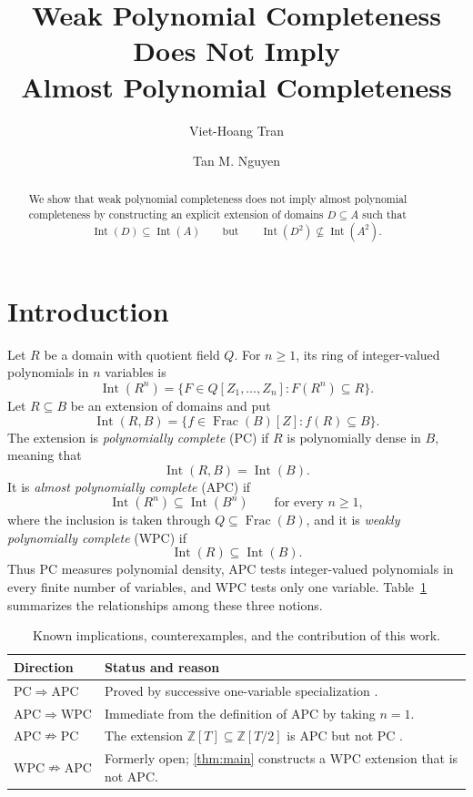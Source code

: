 \documentclass[11pt,reqno]{amsart}
\title[WPC Does Not Imply APC]{Weak Polynomial Completeness Does Not Imply \\ Almost Polynomial Completeness}
\author{Viet-Hoang Tran}
\author{Tan M. Nguyen}
\date{}
\numberwithin{equation}{section}
\theoremstyle{plain}
\theoremstyle{definition}
\theoremstyle{remark}
\newcommand{\Int}{\operatorname{Int}}
\newcommand{\Frac}{\operatorname{Frac}}
\begin{document}
\raggedbottom

\begin{abstract}
We show that weak polynomial completeness does not imply almost
polynomial completeness by constructing an explicit extension of
domains \(D\subseteq A\) such that
\[
 \Int(D)\subseteq\Int(A)
 \qquad\text{but}\qquad
 \Int(D^2)\nsubseteq\Int(A^2).
\]
\end{abstract}

\maketitle

\section{Introduction}

Let \(R\) be a domain with quotient field \(Q\).  For \(n\geq 1\), its
ring of integer-valued polynomials in \(n\) variables is
\[
 \Int(R^n)
   =\{F\in Q[Z_1,\ldots,Z_n]:F(R^n)\subseteq R\}.
\]
Let \(R\subseteq B\) be an extension of domains and put
\[
 \Int(R,B)
   =\{f\in\Frac(B)[Z]:f(R)\subseteq B\}.
\]
The extension is \emph{polynomially complete} (PC) if \(R\) is
polynomially dense in \(B\), meaning that
\[
 \Int(R,B)=\Int(B).
\]
It is \emph{almost polynomially complete} (APC) if
\[
 \Int(R^n)\subseteq\Int(B^n)
 \qquad\text{for every }n\geq1,
\]
where the inclusion is taken through
\(Q\subseteq\Frac(B)\), and it is
\emph{weakly polynomially complete} (WPC) if
\[
 \Int(R)\subseteq\Int(B).
\]
Thus PC measures polynomial density, APC tests integer-valued
polynomials in every finite number of variables, and WPC tests only
one variable. Table~\ref{tab:hierarchy} summarizes the relationships among these three notions.

\begin{table}[H]
\centering
\footnotesize
\renewcommand{\arraystretch}{1.10}
\begin{tabularx}{0.82\textwidth}{@{}lX@{}}
\toprule
Direction & Status and reason\\
\midrule
\(\mathrm{PC}\Rightarrow\mathrm{APC}\)
& Proved by successive one-variable specialization
  \cite[Section~7]{Elliott2007}.\\
\(\mathrm{APC}\Rightarrow\mathrm{WPC}\)
& Immediate from the definition of APC by taking
  \(n=1\).\\
\(\mathrm{APC}\nRightarrow\mathrm{PC}\)
& The extension
  \(\mathbb Z[T]\subseteq\mathbb Z[T/2]\)
  is APC but not PC \cite[p.~231]{Elliott2009}.\\
\(\mathrm{WPC}\nRightarrow\mathrm{APC}\)
& Formerly open; \cref{thm:main}
  constructs a WPC extension that is not APC.\\
\bottomrule
\end{tabularx}
\caption{Known implications, counterexamples, and the contribution of
this work.}
\label{tab:hierarchy}
\end{table}
\end{document}
